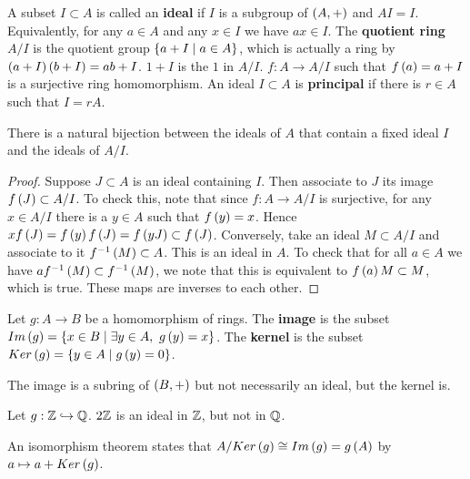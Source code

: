 
\begin{definition}
A subset $ I \subset A $ is called an \textbf{ideal} if $ I $ is a subgroup of $ \left( A, + \right) $ and $ AI = I $. Equivalently, for any $ a \in A $ and any $ x \in I $ we have $ ax \in I $. The \textbf{quotient ring} $ A / I $ is the quotient group $ \left\{ a + I \mid a \in A \right\} $, which is actually a ring by $ \left( a + I \right)\left( b + I \right) = ab + I $. $ 1 + I $ is the $ 1 $ in $ A / I $. $ f : A \to A / I $ such that $ f\left( a \right) = a + I $ is a surjective ring homomorphism. An ideal $ I \subset A $ is \textbf{principal} if there is $ r \in A $ such that $ I = rA $.
\end{definition}

\begin{proposition}
There is a natural bijection between the ideals of $ A $ that contain a fixed ideal $ I $ and the ideals of $ A / I $.
\end{proposition}

\begin{proof}
Suppose $ J \subset A $ is an ideal containing $ I $. Then associate to $ J $ its image $ f\left( J \right) \subset A / I $. To check this, note that since $ f : A \to A / I $ is surjective, for any $ x \in A / I $ there is a $ y \in A $ such that $ f\left( y \right) = x $. Hence $ xf\left( J \right) = f\left( y \right)f\left( J \right) = f\left( yJ \right) \subset f\left( J \right) $. Conversely, take an ideal $ M \subset A / I $ and associate to it $ f^{-1}\left( M \right) \subset A $. This is an ideal in $ A $. To check that for all $ a \in A $ we have $ af^{-1}\left( M \right) \subset f^{-1}\left( M \right) $, we note that this is equivalent to $ f\left( a \right)M \subset M $, which is true. These maps are inverses to each other.
\end{proof}

\begin{definition}
Let $ g : A \to B $ be a homomorphism of rings. The \textbf{image} is the subset $ Im\left( g \right) = \left\{ x \in B \mid \exists y \in A, \ g\left( y \right) = x \right\} $. The \textbf{kernel} is the subset $ Ker\left( g \right) = \left\{ y \in A \mid g\left( y \right) = 0 \right\} $.
\end{definition}

The image is a subring of $ \left( B, + \right) $ but not necessarily an ideal, but the kernel is.

\begin{example*}
Let $ g : \mathbb{Z} \hookrightarrow \mathbb{Q} $. $ 2\mathbb{Z} $ is an ideal in $ \mathbb{Z} $, but not in $ \mathbb{Q} $.
\end{example*}

An isomorphism theorem states that $ A / Ker\left( g \right) \cong Im\left( g \right) = g\left( A \right) $ by $ a \mapsto a + Ker\left( g \right) $.

